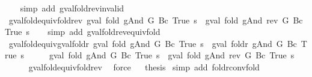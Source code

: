 \begin{isabellebody}
\ \ \isamarkupfalse%
\ {\isacharparenleft}simp\ add{\isacharcolon}\ gval{\isacharunderscore}fold{\isacharunderscore}rev{\isacharunderscore}invalid{\isacharparenright}%
\endisatagproof
{\isafoldproof}%
%
\isadelimproof
\isanewline
%
\endisadelimproof
\isanewline
{}\isamarkupfalse%
\ gval{\isacharunderscore}fold{\isacharunderscore}equiv{\isacharunderscore}fold{\isacharunderscore}rev{\isacharcolon}\ {\isachardoublequoteopen}gval\ {\isacharparenleft}fold\ gAnd\ G\ {\isacharparenleft}Bc\ True{\isacharparenright}{\isacharparenright}\ s\ {\isacharequal}\ gval\ {\isacharparenleft}fold\ gAnd\ {\isacharparenleft}rev\ G{\isacharparenright}\ {\isacharparenleft}Bc\ True{\isacharparenright}{\isacharparenright}\ s{\isachardoublequoteclose}\isanewline
%
\isadelimproof
\ \ %
\endisadelimproof
%
\isatagproof
{}\isamarkupfalse%
\ {\isacharparenleft}simp\ add{\isacharcolon}\ gval{\isacharunderscore}fold{\isacharunderscore}rev{\isacharunderscore}equiv{\isacharunderscore}fold{\isacharparenright}%
\endisatagproof
{\isafoldproof}%
%
\isadelimproof
\isanewline
%
\endisadelimproof
\isanewline
{}\isamarkupfalse%
\ gval{\isacharunderscore}fold{\isacharunderscore}equiv{\isacharunderscore}gval{\isacharunderscore}foldr{\isacharcolon}\ {\isachardoublequoteopen}gval\ {\isacharparenleft}fold\ gAnd\ G\ {\isacharparenleft}Bc\ True{\isacharparenright}{\isacharparenright}\ s\ {\isacharequal}\ gval\ {\isacharparenleft}foldr\ gAnd\ G\ {\isacharparenleft}Bc\ True{\isacharparenright}{\isacharparenright}\ s{\isachardoublequoteclose}\isanewline
%
\isadelimproof
%
\endisadelimproof
%
\isatagproof
{}\isamarkupfalse%
\ {\isacharminus}\isanewline
\ \ \isamarkupfalse%
\ {\isachardoublequoteopen}gval\ {\isacharparenleft}fold\ gAnd\ G\ {\isacharparenleft}Bc\ True{\isacharparenright}{\isacharparenright}\ s\ {\isacharequal}\ gval\ {\isacharparenleft}fold\ gAnd\ {\isacharparenleft}rev\ G{\isacharparenright}\ {\isacharparenleft}Bc\ True{\isacharparenright}{\isacharparenright}\ s{\isachardoublequoteclose}\isanewline
\ \ \ \ \isamarkupfalse%
\ gval{\isacharunderscore}fold{\isacharunderscore}equiv{\isacharunderscore}fold{\isacharunderscore}rev\ \isamarkupfalse%
\ force\isanewline
{}\isamarkupfalse%
\ \isamarkupfalse%
\ {\isacharquery}thesis\isanewline
{}\isamarkupfalse%
\ {\isacharparenleft}simp\ add{\isacharcolon}\ foldr{\isacharunderscore}conv{\isacharunderscore}fold{\isacharparenright}\isanewline
{}\isamarkupfalse%
%
\endisatagproof

\end{isabellebody}
